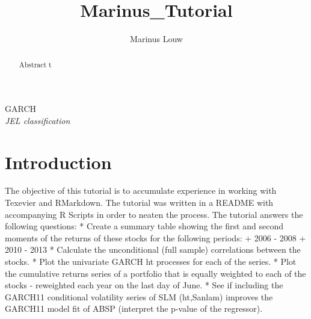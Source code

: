 \documentclass[11pt,preprint, authoryear]{elsarticle}
\numberwithin{equation}{section}
\numberwithin{figure}{section}
\numberwithin{table}{section}
\begin{document}
\begin{frontmatter}  %

\title{Marinus\_Tutorial}





\author[Add1]{Marinus Louw}





\address[Add1]{Financial Economtrics Course, Stellenbosch University, South Africa}


\begin{abstract}
\small{
Abstract t
}
\end{abstract}

\vspace{1cm}

\begin{keyword}
\footnotesize{
GARCH \\ \vspace{0.3cm}
\textit{JEL classification} 
}
\end{keyword}
\vspace{0.5cm}
\end{frontmatter}



\pagestyle{fancy}
\chead{}
\rhead{}
\lfoot{}
\lhead{}
\cfoot{}


\headsep 35pt %




\section{\texorpdfstring{Introduction
\label{Introduction}}{Introduction }}\label{introduction}

The objective of this tutorial is to accumulate experience in working
with Texevier and RMarkdown. The tutorial was written in a README with
accompanying R Scripts in order to neaten the process. The tutorial
answers the following questions: * Create a summary table showing the
first and second moments of the returns of these stocks for the
following periods: + 2006 - 2008 + 2010 - 2013 * Calculate the
unconditional (full sample) correlations between the stocks. * Plot the
univariate GARCH ht processes for each of the series. * Plot the
cumulative returns series of a portfolio that is equally weighted to
each of the stocks - reweighted each year on the last day of June. * See
if including the GARCH11 conditional volatility series of SLM
(ht,Sanlam) improves the GARCH11 model fit of ABSP (interpret the
p-value of the regressor).
\end{document}
